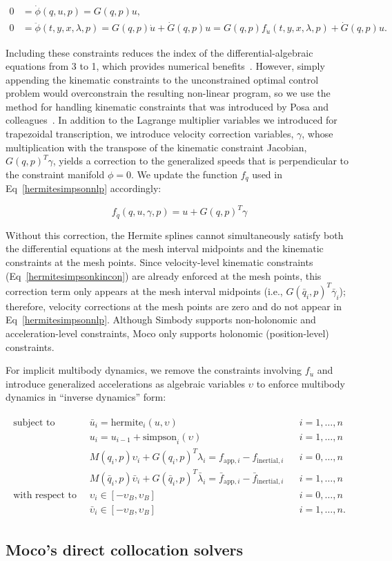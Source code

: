 \documentclass[10pt,letterpaper]{article}
\newcommand{\hermitesimpsonkincon}{
    \begin{align}
        0 &= \dot{\phi}(q, u, p) = G(q, p) u, \label{hermitesimpsonkincon} \\
        0 &= \ddot{\phi}(t, y, x, \lambda, p) = G(q, p) \dot{u} + \dot{G}(q, p) u = G(q, p) f_{\dot{u}}(t, y, x, \lambda, p) + \dot{G}(q, p) u.
    \end{align}
}
\newcommand{\hermitesimpsonimplicit}{
\begin{align}
    \begin{aligned}
    \mbox{subject to} \quad
         & \bar{u}_i = \textrm{hermite}_i(u, \upsilon) && i = 1, \ldots, n \\
         & u_i = u_{i-1} + \textrm{simpson}_i(\upsilon)  && i = 1, \ldots, n \\
         & M(q_i, p)\upsilon_i + G(q_i, p)^T \lambda_i =
          f_{\textrm{app},i} -
            f_{\textrm{inertial},i} && i = 0, \ldots, n \\
         & M(\bar{q}_i, p)\bar{\upsilon}_i + G(\bar{q}_i, p)^T \bar{\lambda}_i =
          \bar{f}_{\textrm{app},i} -
            \bar{f}_{\textrm{inertial},i} && i = 1, \ldots, n \\
    \mbox{with respect to} \quad
         & \upsilon_i \in [-\upsilon_{B}, \upsilon_{B}] && i = 0, \ldots, n \\
         & \bar{\upsilon}_i \in [-\upsilon_{B}, \upsilon_{B}] && i = 1, \ldots, n.
    \end{aligned}
\end{align}
}
\begin{document}
\hermitesimpsonkincon

Including these constraints reduces the index of the differential-algebraic equations from 3 to 1, which provides numerical benefits~\cite{Hairer:1996,Campbell:2016,Betts:2010}. However, simply appending the kinematic constraints to the unconstrained optimal control problem would overconstrain the resulting non-linear program, so we use the method for handling kinematic constraints that was introduced by Posa and colleagues~\cite{Posa:2016}. In addition to the Lagrange multiplier variables we introduced for trapezoidal transcription, we introduce velocity correction variables, $\gamma$, whose multiplication with the transpose of the kinematic constraint Jacobian, $G(q, p)^T \gamma$, yields a correction to the generalized speeds that is perpendicular to the constraint manifold $\phi = 0$. We update the function $f_{\dot{q}}$ used in Eq~\ref{hermitesimpsonnlp} accordingly:

\begin{equation}
f_{\dot{q}}(q, u, \gamma, p) = u + G(q, p)^T \gamma
\end{equation}

Without this correction, the Hermite splines cannot simultaneously satisfy both the differential equations at the mesh interval midpoints and the kinematic constraints at the mesh points. Since velocity-level kinematic constraints (Eq~\ref{hermitesimpsonkincon}) are already enforced at the mesh points, this correction term only appears at the mesh interval midpoints (i.e., $G(\bar{q}_i, p)^T \bar{\gamma}_i$); therefore, velocity corrections at the mesh points are zero and do not appear in Eq~\ref{hermitesimpsonnlp}. Although Simbody supports non-holonomic and acceleration-level constraints, Moco only supports holonomic (position-level) constraints.

For implicit multibody dynamics, we remove the constraints involving $f_{\dot{u}}$ and introduce generalized accelerations as algebraic variables $\upsilon$ to enforce multibody dynamics in “inverse dynamics” form:

\hermitesimpsonimplicit

\subsection*{Moco's direct collocation solvers}
\end{document}
